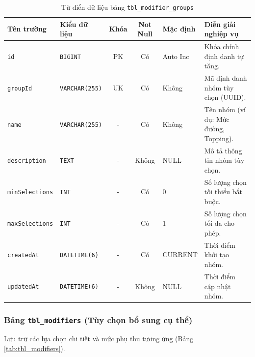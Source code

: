 \begin{table}[htbp]
\centering
\caption{Từ điển dữ liệu bảng \texttt{tbl\_modifier\_groups}}
\label{tab:tbl_modifier_groups}
\vspace{2mm}
\begin{tabularx}{\textwidth}{|p{2.5cm}|p{2.8cm}|c|c|p{1.8cm}|X|}
\hline
\textbf{Tên trường} & \textbf{Kiểu dữ liệu} & \textbf{Khóa} & \textbf{Not Null} & \textbf{Mặc định} & \textbf{Diễn giải nghiệp vụ} \\ \hline
\texttt{id} & \texttt{BIGINT} & PK & Có & Auto Inc & Khóa chính định danh tự tăng. \\ \hline
\texttt{groupId} & \texttt{VARCHAR(255)} & UK & Có & Không & Mã định danh nhóm tùy chọn (UUID). \\ \hline
\texttt{name} & \texttt{VARCHAR(255)} & - & Có & Không & Tên nhóm (ví dụ: Mức đường, Topping). \\ \hline
\texttt{description} & \texttt{TEXT} & - & Không & NULL & Mô tả thông tin nhóm tùy chọn. \\ \hline
\texttt{minSelections} & \texttt{INT} & - & Có & 0 & Số lượng chọn tối thiểu bắt buộc. \\ \hline
\texttt{maxSelections} & \texttt{INT} & - & Có & 1 & Số lượng chọn tối đa cho phép. \\ \hline
\texttt{createdAt} & \texttt{DATETIME(6)} & - & Có & CURRENT & Thời điểm khởi tạo nhóm. \\ \hline
\texttt{updatedAt} & \texttt{DATETIME(6)} & - & Không & NULL & Thời điểm cập nhật nhóm. \\ \hline
\end{tabularx}
\end{table}

\subsubsection{Bảng \texttt{tbl\_modifiers} (Tùy chọn bổ sung cụ thể)}
Lưu trữ các lựa chọn chi tiết và mức phụ thu tương ứng (Bảng \ref{tab:tbl_modifiers}).

